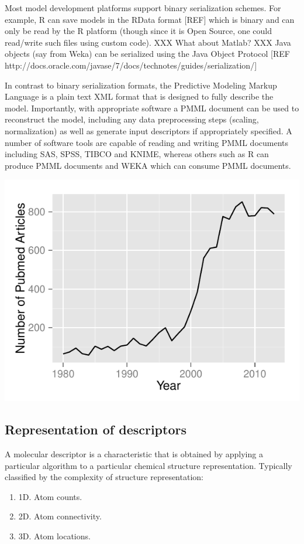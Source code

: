 \documentclass[12pt,letterpaper]{article}
\begin{document}
Most model development platforms support binary serialization
schemes. For example, R can save models in the RData format [REF]
which is binary and can only be read by the R platform (though since
it is Open Source, one could read/write such files using custom
code). XXX What about Matlab? XXX Java objects (say from Weka) can
be serialized using the Java Object Protocol [REF http://docs.oracle.com/javase/7/docs/technotes/guides/serialization/]

In contrast to binary serialization formats, the Predictive Modeling
Markup Language is a plain text XML format that is designed to fully
describe the model. Importantly, with appropriate software a PMML
document can be used to reconstruct the model, including any data
preprocessing steps (scaling, normalization) as well as generate input
descriptors if appropriately specified. A number of software tools are
capable of reading and writing PMML documents including SAS, SPSS,
TIBCO and KNIME, whereas others such as R can produce PMML documents
and WEKA which can consume PMML documents.

{}
{
  \includegraphics{img/count-qsar}
}

\subsection{Representation of descriptors}

A molecular descriptor is a characteristic that is obtained by applying
a particular algorithm to a particular chemical structure representation.
Typically classified by the complexity of structure representation:
\begin{enumerate}
  \item 1D. Atom counts.
  \item 2D. Atom connectivity.
  \item 3D. Atom locations.
\end{enumerate}
\end{document}
